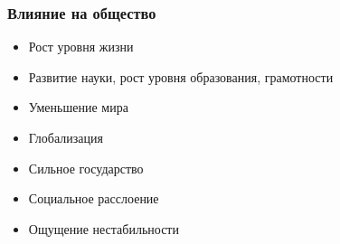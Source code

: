 \documentclass[aspectratio=169]{beamer}
\begin{document}
\begin{bframe}\frametitle{Влияние на общество}
\begin{itemize}
\item<+-> Рост уровня жизни
\item<+-> Развитие науки, рост уровня образования, грамотности
\item<+-> Уменьшение мира
\item<+-> Глобализация
\item<+-> Сильное государство
\item<+-> Социальное расслоение
\item<+-> Ощущение нестабильности
\end{itemize}
\end{bframe}
\end{document}
